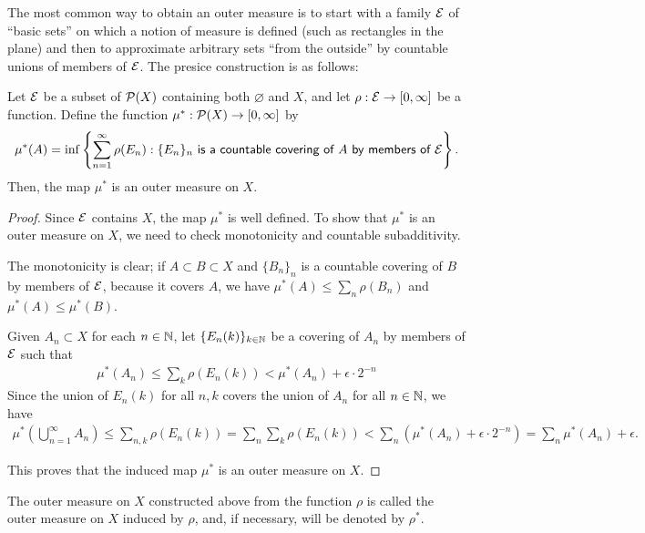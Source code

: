 The most common way to obtain an outer measure is to start with a family ${\mathcal{E}}$ of ``basic sets'' on which a notion of measure is defined (such as rectangles in the plane) and then to approximate arbitrary sets ``from the outside'' by countable unions of members of ${\mathcal{E}}$.
The presice construction is as follows:
\begin{prop}
    Let ${\mathcal{E}}$ be a subset of ${\mathcal{P}}(X)$ containing both $\varnothing$ and $X$, and let $\rho: {\mathcal{E}}\rightarrow[0, \infty]$ be a function.
    Define the function $\mu^*: {\mathcal{P}}(X)\rightarrow[0, \infty]$ by
    \begin{align}\label{induced outer measure}
        \mu^*(A)=\inf\left\{\sum_{n=1}^\infty\rho(E_n)
        :
        \textsf{$\{E_n\}_n$ is a countable covering of $A$ by members of ${\mathcal{E}}$}\right\}.
    \end{align}
    Then, the map $\mu^*$ is an outer measure on $X$.
\end{prop}
\begin{proof}
    Since ${\mathcal{E}}$ contains $X$, the map $\mu^*$ is well defined.
    To show that $\mu^*$ is an outer measure on $X$, we need to check monotonicity and countable subadditivity.

    The monotonicity is clear; if $A\subset B\subset X$ and $\{B_n\}_n$ is a countable covering of $B$ by members of ${\mathcal{E}}$, because it covers $A$, we have $\mu^*(A)\leq\sum_n\rho(B_n)$ and $\mu^*(A)\leq\mu^*(B)$.
    
    Given $A_n\subset X$ for each $n\in{\mathbb{N}}$, let $\{E_n(k)\}_{k\in{\mathbb{N}}}$ be a covering of $A_n$ by members of ${\mathcal{E}}$ such that
    \begin{align*}
        \mu^*(A_n)\leq\sum_k\rho(E_n(k))<\mu^*(A_n)+\epsilon\cdot 2^{-n}
    \end{align*}
    Since the union of $E_n(k)$ for all $n, k$ covers the union of $A_n$ for all $n\in{\mathbb{N}}$, we have
    \begin{align*}
        \mu^*\left(\bigcup_{n=1}^\infty A_n\right)\leq\sum_{n, k}\rho(E_n(k))=\sum_n\sum_k\rho(E_n(k))<\sum_n(\mu^*(A_n)+\epsilon\cdot 2^{-n})=\sum_n\mu^*(A_n)+\epsilon.
    \end{align*}

    This proves that the induced map $\mu^*$ is an outer measure on $X$.
\end{proof}
\begin{rmk}
    The outer measure on $X$ constructed above from the function $\rho$ is called the outer measure on $X$ induced by $\rho$, and, if necessary, will be denoted by $\rho^*$.
\end{rmk}

